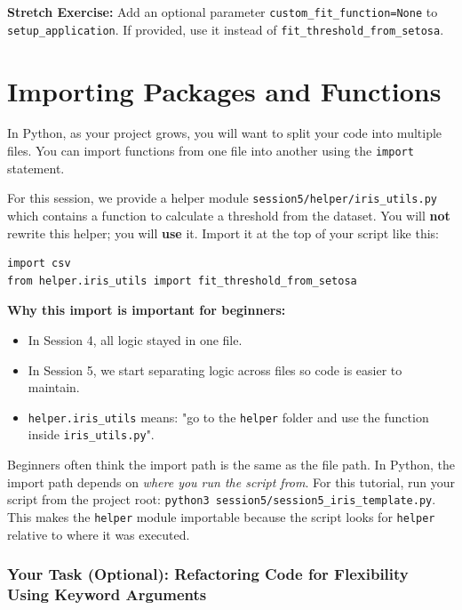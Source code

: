 \textbf{Stretch Exercise:} Add an optional parameter \texttt{custom\_fit\_function=None} to \texttt{setup\_application}. If provided, use it instead of \texttt{fit\_threshold\_from\_setosa}.
\section{Importing Packages and Functions}
In Python, as your project grows, you will want to split your code into multiple files. You can import functions from one file into another using the \texttt{import} statement.

For this session, we provide a helper module \texttt{session5/helper/iris\_utils.py} which contains a function to calculate a threshold from the dataset.
You will \textbf{not} rewrite this helper; you will \textbf{use} it.
Import it at the top of your script like this:

\begin{verbatim}
import csv
from helper.iris_utils import fit_threshold_from_setosa
\end{verbatim}

\noindent
\textbf{Why this import is important for beginners:}
\begin{itemize}
    \item In Session 4, all logic stayed in one file.
    \item In Session 5, we start separating logic across files so code is easier to maintain.
    \item \texttt{helper.iris\_utils} means: "go to the \texttt{helper} folder and use the function inside \texttt{iris\_utils.py}".
\end{itemize}

\begin{tcolorbox}[title=Important: Running from the Project Root]
Beginners often think the import path is the same as the file path.
In Python, the import path depends on \textit{where you run the script from}.
For this tutorial, run your script from the project root:
\texttt{python3 session5/session5\_iris\_template.py}. This makes the \texttt{helper} module importable because the script looks for \texttt{helper} relative to where it was executed.
\end{tcolorbox}


\subsubsection{Your Task (Optional): Refactoring Code for Flexibility Using Keyword Arguments}


